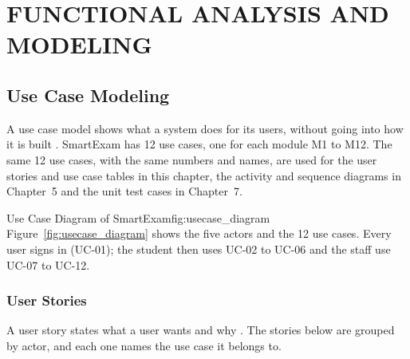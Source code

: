 \chapter{FUNCTIONAL ANALYSIS AND MODELING}

\section{Use Case Modeling}

A use case model shows what a system does for its users, without going into how it is built \cite{uml_systems_analysis}. SmartExam has 12 use cases, one for each module M1 to M12. The same 12 use cases, with the same numbers and names, are used for the user stories and use case tables in this chapter, the activity and sequence diagrams in Chapter~5 and the unit test cases in Chapter~7.

%
{Use Case Diagram of SmartExam}{fig:usecase_diagram}%
{Figure~\ref{fig:usecase_diagram} shows the five actors and the 12 use cases. Every user signs in (UC-01); the student then uses UC-02 to UC-06 and the staff use UC-07 to UC-12.}

\subsection{User Stories}

A user story states what a user wants and why \cite{user_stories_applied}. The stories below are grouped by actor, and each one names the use case it belongs to.

